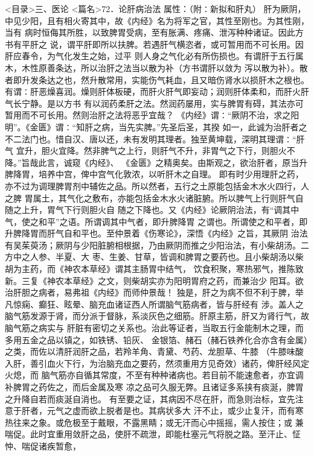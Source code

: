 \documentclass[a4paper,12pt,UTF8,twoside]{ctexbook}
\begin{document}
<目录>三、医论
<篇名>72．论肝病治法
属性：（附∶新拟和肝丸） 
肝为厥阴，中见少阳，且有相火寄其中，故《内经》名为将军之官，其性至刚也。为其性刚，当有 
病时恒侮其所胜，以致脾胃受病，至有胀满、疼痛、泄泻种种诸证。因此方书有平肝之 
说，谓平肝即所以扶脾。若遇肝气横恣者，或可暂用而不可长用。因肝应春令，为气化发生之始，过平 
则人身之气化必有所伤损也。有谓肝于五行属木，木性原善条达，所以治肝之法当以散为补（方书谓肝以敛为 
泻以散为补）。散者即升发条达之也，然升散常用，实能伤气耗血，且又暗伤肾水以损肝木之根也。 
有谓∶肝恶燥喜润。燥则肝体板硬，而肝火肝气即妄动；润则肝体柔和，而肝火肝气长宁静。是以方书 
有以润药柔肝之法。然润药屡用，实与脾胃有碍，其法亦可暂用而不可长用。然则治肝之法将恶乎宜哉？ 
《内经》谓∶“厥阴不治，求之阳明”。《金匮》谓∶“知肝之病，当先实脾。”先圣后圣，其揆 
如一，此诚为治肝者之不二法门也。惜自汉、唐以还，未有发明其理者。独至黄坤载，深明其理谓∶“肝气 
宜升，胆火宜降。然非脾气之上行，则肝气不升，非胃气之下行，则胆火不降。”旨哉此言，诚窥《内经》、 
《金匮》之精奥矣。由斯观之，欲治肝者，原当升脾降胃，培养中宫，俾中宫气化敦浓，以听肝木之自理。 
即有时少用理肝之药，亦不过为调理脾胃剂中辅佐之品。所以然者，五行之土原能包括金木水火四行，人之脾 
胃属土，其气化之敷布，亦能包括金木水火诸脏腑。所以脾气上行则肝气自随之上升，胃气下行则胆火自 
随之下降也。又《内经》论厥阴治法，有“调其中气，使之和平”之语。所谓调其中气者，即升脾降胃 
之谓也。所谓使之和平者，即升脾降胃而肝气自和平也。至仲景着《伤寒论》，深悟《内经》之旨，其厥阴 
治法有吴茱萸汤；厥阴与少阳脏腑相根据，乃由厥阴而推之少阳治法，有小柴胡汤。二方中之人参、半夏、大 
枣、生姜、甘草，皆调和脾胃之要药也。且小柴胡汤以柴胡为主药，而《神农本草经》谓其主肠胃中结气， 
饮食积聚，寒热邪气，推陈致新。三复《神农本草经》之文，则柴胡实亦为阳明胃府之药，而兼治少 
阳耳。欲治肝胆之病者，易弗祖《内经》而师仲景哉！ 
独是，肝之为病不但不利于脾，举凡惊痫、癫狂、眩晕、脑充血诸证西人所谓脑气筋病者，皆与肝经有 
涉。盖人之脑气筋发源于肾，而分派于督脉，系淡灰色之细筋。肝原主筋，肝又为肾行气，故脑气筋之病实与 
肝脏有密切之关系也。治此等证者，当取五行金能制木之理，而多用五金之品以镇之，如铁锈、铅灰、 
金银箔、赭石（赭石铁养化合亦含有金属）之类，而佐以清肝润肝之品，若羚羊角、青黛、芍药、龙胆草、牛膝 
（牛膝味酸入肝，善引血火下行，为治脑充血之要药，然须重用方见奇效）诸药，俾肝经风定火熄，而 
脑气筋亦自循其常度，不至有种种诸病也。若目前不能速愈者，亦宜调补脾胃之药佐之，而后金属及寒 
凉之品可久服无弊。且诸证多系挟有痰涎，脾胃之升降自若而痰涎自消也。 
有至要之证，其病因不尽在肝，而急则治标，宜先注意于肝者，元气之虚而欲上脱者是也。其病状多大 
汗不止，或少止复汗，而有寒热往来之象。或危极至于戴眼，不露黑睛；或无汗而心中摇摇，需人按住；或 
兼喘促。此时宜重用敛肝之品，使肝不疏泄，即能杜塞元气将脱之路。至汗止、怔忡、喘促诸疾暂愈， 
\end{document}
